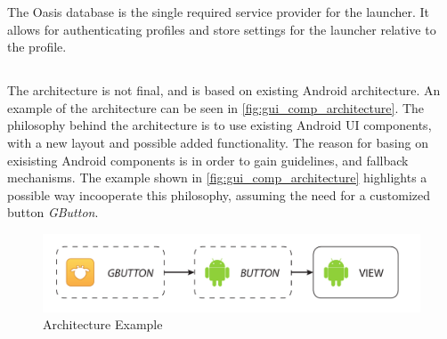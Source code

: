 The Oasis database is the single required service provider for the launcher.
It allows for authenticating profiles and store settings for the launcher relative to the profile.

\subsection{\guicomponents[]}
The \guicomponents[] architecture is not final, and is based on existing Android architecture. An example of the architecture can be seen in \autoref{fig:gui_comp_architecture}.
The philosophy behind the architecture is to use existing Android UI components, with a new layout and possible added functionality.
The reason for basing on exisisting Android components is in order to gain guidelines, and fallback mechanisms.
The example shown in \autoref{fig:gui_comp_architecture} highlights a possible way incooperate this philosophy, assuming the need for a customized button \textit{GButton}. 
\begin{figure}[h]
	\centering
	\includegraphics[width=1\textwidth]{gfx/gui_components_architecture.pdf}
	\caption{\guicomponents[] Architecture Example}
	\label{fig:gui_comp_architecture}
\end{figure}


